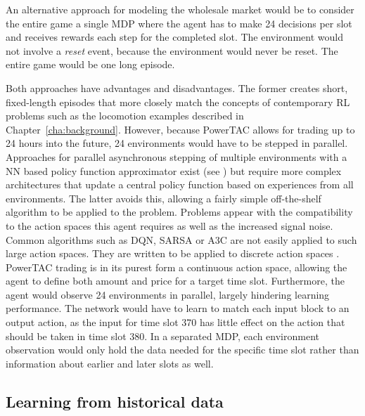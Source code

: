 An alternative approach for modeling the wholesale market would be to consider the entire game a single \ac{MDP} where
the agent has to make 24 decisions per slot and receives rewards each step for the completed slot. The environment would not involve a
\emph{reset} event, because the environment would never be reset. The entire game would be one long episode.

Both approaches have advantages and disadvantages. The former creates short, fixed-length episodes that more closely
match the concepts of contemporary \ac{RL} problems such as the locomotion examples described in
Chapter~\ref{cha:background}. However, because \ac{PowerTAC} allows for trading up to 24 hours into the future, 24
environments would have to be stepped in parallel. Approaches for parallel asynchronous stepping of multiple
environments with a \ac{NN} based policy function approximator exist (see \citet{mnih2016asynchronous,hafner2017agents})
but require more complex architectures that update a central policy function based on experiences from all environments.
The latter avoids this, allowing a fairly simple off-the-shelf algorithm to be applied to the problem. Problems appear
with the compatibility to the action spaces this agent requires as well as the increased signal noise. Common algorithms
such as \ac{DQN}, \ac{SARSA} or \ac{A3C} are not easily applied to such large action spaces. They
are written to be applied to discrete action spaces
\cite[]{baselines}. \ac{PowerTAC} trading is in its purest form a
continuous action space, allowing the agent to define both amount and price for a target time slot. Furthermore, the
agent would observe 24 environments in parallel, largely hindering learning performance. The network would have to learn
to match each input block to an output action, as the input for time slot 370 has little effect on the action that
should be taken in time slot 380. In a separated \ac{MDP}, each environment observation would only hold the data needed
for the specific time slot rather than information about earlier and later slots as well.

\subsection{Learning from historical data}%
\label{sub:learning_from_historical_data}

